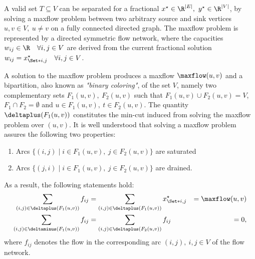 A valid set $T \subseteq V$ can be separated for a fractional $x^\star \in \R^{|E|},\ y^\star \in \R^{|V|}$,
by solving a
maxflow problem between two arbitrary source and sink vertices $u, v \in V,\ u \ne v$ on a fully connected directed graph.
The maxflow problem is represented by a directed symmetric flow network,
where the capacities $w_{ij} \in \R \quad \forall i, j \in V$
are derived from the current fractional solution $w_{ij} = x^\star_{\Set*{i, j}} \quad \forall i, j \in V$.

A solution to the maxflow problem
produces a maxflow $\maxflow(u, v)$ and a bipartition, also known as \textit{"binary coloring"},
of the set $V$,
namely two complementary sets $F_1(u, v),\ F_2(u, v)$
such that $F_1(u, v) \cup F_2(u, v) = V$, $F_1 \cap F_2 = \emptyset$ and $u \in F_1(u, v),\ t \in F_2(u, v)$.
The quantity $\deltaplus(F_1(u, v))$ constitutes the min-cut induced from solving the maxflow problem over $(u, v)$.
It is well understood that solving a maxflow problem assures the following two properties:
\begin{enumerate}
	\setlength{\itemsep}{0pt}
	\setlength{\parskip}{0pt}

	\item Arcs $\{ (i, j) \mid i \in F_1(u, v),\ j \in F_2(u, v) \}$ are saturated
	\item Arcs $\{ (j, i) \mid i \in F_1(u, v),\ j \in F_2(u, v) \}$ are drained.
\end{enumerate}
As a result, the following statements hold:
\begin{align}
	\sum_{(i, j) \in \deltaplus(F_1(u, v))} f_{ij}  & = \sum_{(i, j) \in \deltaplus(F_1(u, v))} x^\star_{\Set*{i, j}} & = \maxflow(u, v) \\
	\sum_{(i, j) \in \deltaminus(F_1(u, v))} f_{ij} & = \sum_{(i, j) \in \deltaplus(F_2(u, v))} f_{ij}                & = 0,
\end{align}
where $f_{ij}$ denotes the flow in the corresponding arc $(i, j),\ i, j \in V$ of the flow network.

